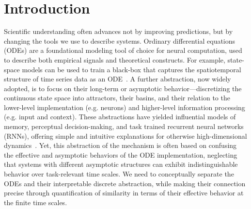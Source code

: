 \documentclass{article}
\theoremstyle{definition} \newtheorem{definition}{Definition}  \newtheorem{example}{Example}
\theoremstyle{remark} \newtheorem{remark}{Remark}
\newcounter{ct}
\begin{document}
\section{Introduction}\label{sec:intro}
Scientific understanding often advances not by improving predictions, but by changing the tools we use to describe systems.
Ordinary differential equations (ODEs) are a foundational modeling tool of choice for neural computation, used to describe both empirical signals and theoretical constructs.
For example, state-space models can be used to train a black-box that captures the spatiotemporal structure of time series data as an ODE~\citep{nair2023approximate,pei2neural,Dowling2024b}.
A further abstraction, now widely adopted, is to focus on their long-term or asymptotic behavior---discretizing the continuous state space into attractors, their basins, and their relation to the lower-level implementation (e.g. neurons) and higher-level information processing (e.g. input and context).
These abstractions have yielded influential models of memory\citep{machens2008ca}, perceptual decision-making\citep{mante2013context}, and task trained recurrent neural networks (RNNs)\citep{driscoll2024flexible}, offering simple and intuitive explanations for otherwise high-dimensional dynamics~\citep{vyas2020ctd,versteeg2025computation}.
Yet, this abstraction of the mechanism is often based on confusing the effective and asymptotic behaviors of the ODE implementation, neglecting that systems with different asymptotic structures can exhibit indistinguishable behavior over task-relevant time scales.
We need to conceptually separate the ODEs and their interpretable discrete abstraction, while making their connection precise through quantification of similarity in terms of their effective behavior at the finite time scales.

\end{document}
